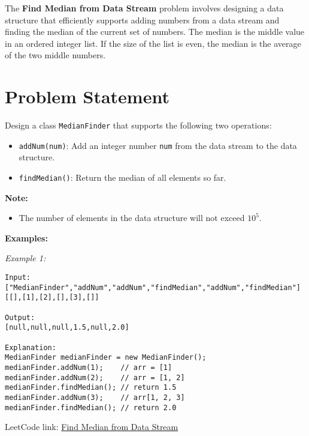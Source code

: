 
\label{problem:find_median_from_data_stream}

The \textbf{Find Median from Data Stream} problem involves designing a data structure that efficiently supports adding numbers from a data stream and finding the median of the current set of numbers. The median is the middle value in an ordered integer list. If the size of the list is even, the median is the average of the two middle numbers.

\section*{Problem Statement}

Design a class \texttt{MedianFinder} that supports the following two operations:

\begin{itemize}
    \item \texttt{addNum(num)}: Add an integer number \texttt{num} from the data stream to the data structure.
    \item \texttt{findMedian()}: Return the median of all elements so far.
\end{itemize}

\textbf{Note:}
\begin{itemize}
    \item The number of elements in the data structure will not exceed \(10^5\).
\end{itemize}

\textbf{Examples:}

\textit{Example 1:}

\begin{verbatim}
Input:
["MedianFinder","addNum","addNum","findMedian","addNum","findMedian"]
[[],[1],[2],[],[3],[]]

Output:
[null,null,null,1.5,null,2.0]

Explanation:
MedianFinder medianFinder = new MedianFinder();
medianFinder.addNum(1);    // arr = [1]
medianFinder.addNum(2);    // arr = [1, 2]
medianFinder.findMedian(); // return 1.5
medianFinder.addNum(3);    // arr[1, 2, 3]
medianFinder.findMedian(); // return 2.0
\end{verbatim}

LeetCode link: \href{https://leetcode.com/problems/find-median-from-data-stream/}{Find Median from Data Stream}

